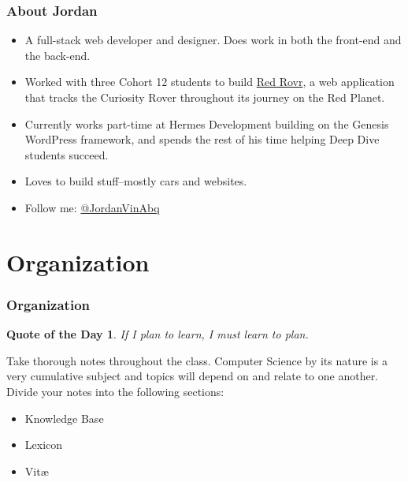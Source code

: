 \documentclass[aspectratio=169]{beamer}
\newtheorem{qotd}{Quote of the Day}
\begin{document}
\begin{frame}
\frametitle{About Jordan}

\begin{itemize}
   \item A full-stack web developer and designer. Does work in both the front-end and the back-end.
   \item Worked with three Cohort 12 students to build \href{https://redrovr.io/}{Red Rovr}, a web application that tracks the Curiosity Rover throughout its journey on the Red Planet.
   \item Currently works part-time at Hermes Development building on the Genesis WordPress framework, and spends the rest of his time helping Deep Dive students succeed.
   \item Loves to build stuff--mostly cars and websites.
   \item Follow me:  \href{https://twitter.com/JordanVinAbq}{@JordanVinAbq}
\end{itemize}
\end{frame}

\section{Organization}
\begin{frame}
\frametitle{Organization}
\begin{qotd}
If I plan to learn, I must learn to plan.
\end{qotd}
\pause

Take thorough notes throughout the class. Computer Science by its nature is a very cumulative subject and topics will depend on and relate to one another. Divide your notes into the following sections:

\pause
\begin{itemize}
	\item Knowledge Base
	\item Lexicon
	\item Vit\ae
\end{itemize}
\end{frame}
\end{document}
